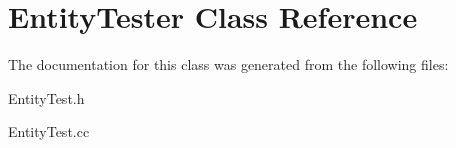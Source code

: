 \hypertarget{classEntityTester}{
\section{EntityTester Class Reference}
\label{classEntityTester}
}


The documentation for this class was generated from the following files:\begin{DoxyCompactItemize}
\item 
EntityTest.h\item 
EntityTest.cc\end{DoxyCompactItemize}
